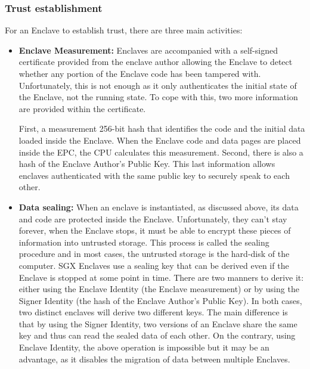 \documentclass[../main.tex]{subfiles}
\begin{document}
\subsubsection{Trust establishment}
\label{section:theoric:trust_establishment}
\par For an Enclave to establish trust, there are three main activities:
\begin{itemize}
    \item \textbf{Enclave Measurement:} Enclaves are accompanied with a self-signed certificate provided from the enclave author allowing the Enclave to detect whether any portion of the Enclave code has been tampered with. Unfortunately, this is not enough as it only authenticates the initial state of the Enclave, not the running state. To cope with this, two more information are provided within the certificate.
    \par First, a measurement 256-bit hash that identifies the code and the initial data loaded inside the Enclave. When the Enclave code and data pages are placed inside the EPC, the CPU calculates this measurement. Second, there is also a hash of the Enclave Author's Public Key. This last information allows enclaves authenticated with the same public key to securely speak to each other.
    \item \textbf{Data sealing:} When an enclave is instantiated, as discussed above, its data and code are protected inside the Enclave. Unfortunately, they can't stay forever, when the Enclave stops, it must be able to encrypt these pieces of information into untrusted storage. This process is called the sealing procedure and in most cases, the untrusted storage is the hard-disk of the computer. SGX Enclaves use a sealing key that can be derived even if the Enclave is stopped at some point in time. There are two manners to derive it: either using the Enclave Identity (the Enclave measurement) or by using the Signer Identity (the hash of the Enclave Author's Public Key). In both cases, two distinct enclaves will derive two different keys. The main difference is that by using the Signer Identity, two versions of an Enclave share the same key and thus can read the sealed data of each other. On the contrary, using Enclave Identity, the above operation is impossible but it may be an advantage, as it disables the migration of data between multiple Enclaves.

\end{itemize}
\end{document}
